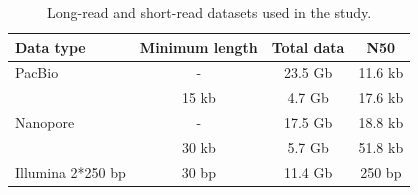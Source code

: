 \begin{suppsection}
\begin{table}[ht]
\centering
\caption{Long-read and short-read datasets used in the study.}
\begin{tabular}{lccc}
\hline
\textbf{Data type} & \textbf{Minimum length} & \textbf{Total data} & \textbf{N50} \\
\hline
PacBio & - & 23.5 Gb & 11.6 kb \\
& 15 kb & 4.7 Gb & 17.6 kb \\
\hline
Nanopore & - & 17.5 Gb & 18.8 kb  \\
& 30 kb & 5.7 Gb & 51.8 kb  \\
\hline
Illumina 2*250 bp & 30 bp & 11.4 Gb & 250 bp \\
\hline
\end{tabular}
\label{tab:datasets}
\end{table}

\end{suppsection}